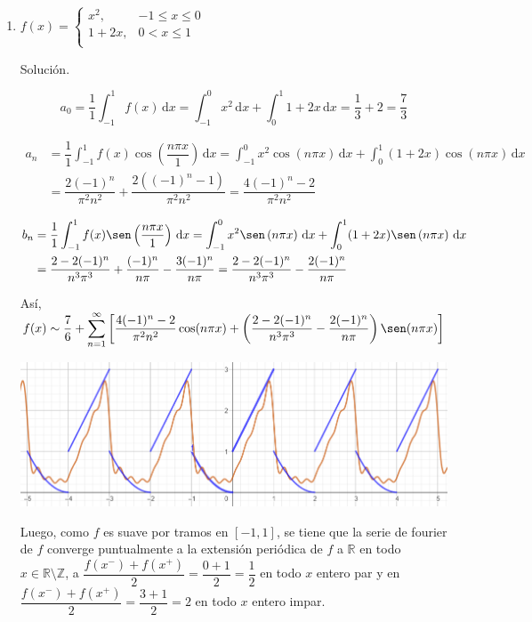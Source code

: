 \documentclass[fleqn]{article}
\newcommand{\real}{\mathbb{R}}
\newcommand{\ent}{\mathbb{Z}}
\newcommand{\intg}[3]{\int_{#1}^{#2} #3 \, \mathrm{d}x}
\begin{document}
\begin{enumerate}[I.]
\begin{enumerate}[(1)]
			\bfseries
			\item $ f(x) = \begin{cases}
				x^2, & -1 \leq x \leq 0 \\
				1 + 2x, & 0 < x \leq 1 \\
			\end{cases} $

			Solución.

			\normalfont

			\begin{equation*}
				a_0 = \dfrac{1}{1} \intg{-1}{1}{f(x)} = \intg{-1}{0}{x^2} + \intg{0}{1}{1 + 2x} = \dfrac{1}{3} + 2 = \dfrac{7}{3}
			\end{equation*}

			\begin{align*}
				a_n &= \dfrac{1}{1} \intg{-1}{1}{f(x) \cos \left( \dfrac{n \pi x}{1} \right)} = \intg{-1}{0}{x^2 \cos \left(n \pi x \right)} + \intg{0}{1}{(1 + 2x) \cos \left(n \pi x \right)} \\
				&= \dfrac{2(-1)^n}{\pi^2 n^2} + \dfrac{2((-1)^n - 1)}{\pi^2 n^2} = \dfrac{4(-1)^n - 2}{\pi^2 n^2} 
			\end{align*}

			\begin{align*}
				b_n &= \dfrac{1}{1} \intg{-1}{1}{f(x) \sen \left( \dfrac{n \pi x}{1} \right)} = \intg{-1}{0}{x^2 \sen \left(n \pi x \right)} + \intg{0}{1}{(1 + 2x) \sen \left(n \pi x \right)} \\
				&= \dfrac{2 - 2(-1)^n}{n^3 \pi^3} + \dfrac{(-1)^n}{n \pi} - \dfrac{3(-1)^n}{n \pi} = \dfrac{2 - 2(-1)^n}{n^3 \pi^3} - \dfrac{2(-1)^n}{n \pi}
			\end{align*}

			Así, $ \displaystyle f(x) \sim \dfrac{7}{6} + \sum_{n=1}^{\infty} \left[ \dfrac{4(-1)^n - 2}{\pi^2 n^2} \cos (n \pi x) + \left( \dfrac{2 - 2(-1)^n}{n^3 \pi^3} - \dfrac{2(-1)^n}{n \pi} \right) \sen (n \pi x) \right] $

			\includegraphics[width=\linewidth]{Ejer4.png}

			Luego, como $f$ es suave por tramos en $ [-1,1] $, se tiene que la serie de fourier de $f$ converge puntualmente a la extensión periódica de $f$ a $ \real $ en todo $ x \in \real \setminus \ent $, a $ \dfrac{f(x^-) + f(x^+)}{2} = \dfrac{0+1}{2} = \dfrac{1}{2} $ en todo $ x $ entero par y en $ \dfrac{f(x^-) + f(x^+)}{2} = \dfrac{3+1}{2} = 2 $ en todo $ x $ entero impar.


\end{enumerate}
\end{enumerate}
\end{document}

